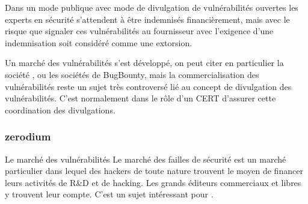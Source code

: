 Dans un mode publique avec mode de divulgation de vulnérabilités ouvertes les experts en sécurité  s'attendent à être indemnisés financièrement, mais avec le risque que signaler ces vulnérabilités au fournisseur avec l'exigence d'une indemnisation soit considéré comme une extorsion. 

Un marché des vulnérabilités s'est développé, on peut citer en particulier la société , ou les sociétés de BugBounty, mais la commercialisation des vulnérabilités reste un sujet très controversé lié au concept de divulgation des vulnérabilités.   C'est normalement dans le rôle d'un CERT d'assurer cette coordination des divulgations.


\begin{frame}
\frametitle<presentation>{zerodium}
\end{frame}


\begin{techworkbox}{Le marché des vulnérabilités}
Le marché des failles de sécurité est un marché particulier dans lequel des hackers de toute nature trouvent le moyen de financer leurs activités de R\&D et de hacking. Les grands éditeurs commerciaux et libres y trouvent leur compte. C'est un sujet intéressant pour \fichetech. 	
\end{techworkbox}





